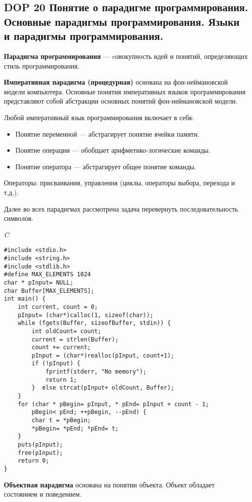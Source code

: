 \subsection*{DOP 20 Понятие  о  парадигме  программирования.  Основные  парадигмы  программирования.  Языки  и  парадигмы программирования.}

\textbf{Парадигма программирования} --- cовокупность идей и понятий, определяющих стиль программирования.

\textbf{Императивная парадигма (процедурная)} основана на фон-неймановской модели компьютера.
Основные понятия императивных языков программирования представляют собой абстракции основных понятий фон-неймановской модели.

Любой императивный язык программирования включает в себя:
\begin{itemize}
    \item Понятие переменной --- абстрагирует понятие ячейки памяти.
    \item Понятие операции --- обобщает арифметико-логические команды.
    \item Понятие оператора --- абстрагирует общее понятие команды.
\end{itemize}

Операторы: присваивания, управления (циклы, операторы выбора, перехода и т.д.).

Далее во всех парадигмах рассмотрена задача перевернуть последовательность символов.

\textit{C}
\begin{lstlisting}[basicstyle=\ttfamily\small, frame=single]
#include <stdio.h>
#include <string.h>
#include <stdlib.h>
#define MAX_ELEMENTS 1024
char * pInput= NULL;
char Buffer[MAX_ELEMENTS];
int main() {
    int current, count = 0;
    pInput= (char*)calloc(1, sizeof(char));
    while (fgets(Buffer, sizeofBuffer, stdin)) {
        int oldCount= count;
        current = strlen(Buffer);
        count += current;
        pInput = (char*)realloc(pInput, count+1);
        if (!pInput) {
            fprintf(stderr, "No memory");
            return 1;
        }  else strcat(pInput+ oldCount, Buffer);
    }
    for (char * pBegin= pInput, * pEnd= pInput + count - 1;
        pBegin< pEnd; ++pBegin, --pEnd) {
        char t = *pBegin;
        *pBegin= *pEnd; *pEnd= t;
    }
    puts(pInput);
    free(pInput);
    return 0;
}
    \end{lstlisting}

\bigbreak
\textbf{Объектная парадигма} основана на понятии объекта.
Объект обладает состоянием и поведением.

